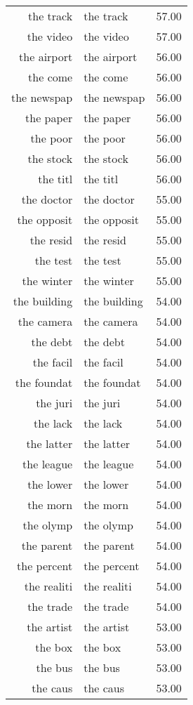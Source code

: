 \begin{table}[ht]
\begin{tabular}{rlr}
  the track & the track & 57.00 \\ 
  the video & the video & 57.00 \\ 
  the airport & the airport & 56.00 \\ 
  the come & the come & 56.00 \\ 
  the newspap & the newspap & 56.00 \\ 
  the paper & the paper & 56.00 \\ 
  the poor & the poor & 56.00 \\ 
  the stock & the stock & 56.00 \\ 
  the titl & the titl & 56.00 \\ 
  the doctor & the doctor & 55.00 \\ 
  the opposit & the opposit & 55.00 \\ 
  the resid & the resid & 55.00 \\ 
  the test & the test & 55.00 \\ 
  the winter & the winter & 55.00 \\ 
  the building & the building & 54.00 \\ 
  the camera & the camera & 54.00 \\ 
  the debt & the debt & 54.00 \\ 
  the facil & the facil & 54.00 \\ 
  the foundat & the foundat & 54.00 \\ 
  the juri & the juri & 54.00 \\ 
  the lack & the lack & 54.00 \\ 
  the latter & the latter & 54.00 \\ 
  the league & the league & 54.00 \\ 
  the lower & the lower & 54.00 \\ 
  the morn & the morn & 54.00 \\ 
  the olymp & the olymp & 54.00 \\ 
  the parent & the parent & 54.00 \\ 
  the percent & the percent & 54.00 \\ 
  the realiti & the realiti & 54.00 \\ 
  the trade & the trade & 54.00 \\ 
  the artist & the artist & 53.00 \\ 
  the box & the box & 53.00 \\ 
  the bus & the bus & 53.00 \\ 
  the caus & the caus & 53.00 \\ 

\end{tabular}
\end{table}
